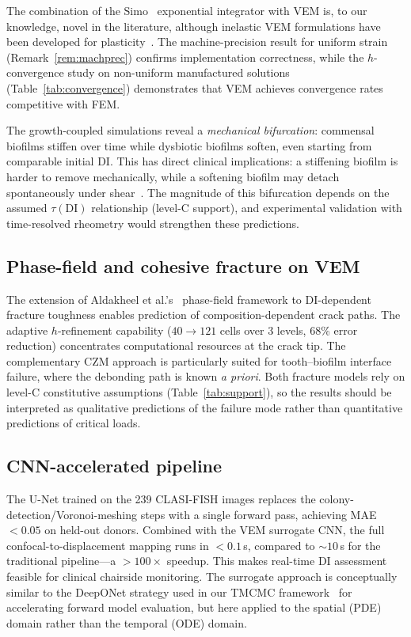 \documentclass[smallextended]{svjour3}
\newcommand{\DI}{\mathrm{DI}}
\begin{document}
The combination of the Simo~\cite{Simo1987} exponential integrator
with VEM is, to our knowledge, novel in the literature, although
inelastic VEM formulations have been developed for
plasticity~\cite{Artioli2017,Wriggers2019}.
The machine-precision result for uniform strain
(Remark~\ref{rem:machprec}) confirms implementation correctness,
while the $h$-convergence study on non-uniform manufactured
solutions (Table~\ref{tab:convergence}) demonstrates that VEM
achieves convergence rates competitive with FEM.

The growth-coupled simulations reveal a \emph{mechanical
bifurcation}: commensal biofilms stiffen over time while dysbiotic
biofilms soften, even starting from comparable initial DI.
This has direct clinical implications: a stiffening biofilm is
harder to remove mechanically, while a softening biofilm may
detach spontaneously under shear~\cite{Stoodley1999}.
The magnitude of this bifurcation depends on the assumed $\tau(\DI)$
relationship (level-C support), and experimental validation with
time-resolved rheometry would strengthen these predictions.

\subsection{Phase-field and cohesive fracture on VEM}

The extension of Aldakheel et al.'s~\cite{Aldakheel2018}
phase-field framework to DI-dependent fracture toughness
enables prediction of composition-dependent crack paths.
The adaptive $h$-refinement capability ($40 \to 121$ cells
over 3 levels, 68\% error reduction) concentrates computational
resources at the crack tip.
The complementary CZM approach is particularly suited for
tooth--biofilm interface failure, where the debonding path is
known \emph{a priori}.
Both fracture models rely on level-C constitutive assumptions
(Table~\ref{tab:support}), so the results should be interpreted
as qualitative predictions of the failure mode rather than
quantitative predictions of critical loads.

\subsection{CNN-accelerated pipeline}

The U-Net trained on the 239 CLASI-FISH images replaces the
colony-detection/Voronoi-meshing steps with a single forward pass,
achieving MAE~$< 0.05$ on held-out donors.
Combined with the VEM surrogate CNN, the full confocal-to-displacement
mapping runs in $< 0.1$\,s, compared to $\sim 10$\,s for the
traditional pipeline---a $> 100\times$ speedup.
This makes real-time DI assessment feasible for clinical
chairside monitoring.
The surrogate approach is conceptually similar to the DeepONet
strategy used in our TMCMC framework~\cite{Klempt2024} for
accelerating forward model evaluation, but here applied to the
spatial (PDE) domain rather than the temporal (ODE) domain.
\end{document}
